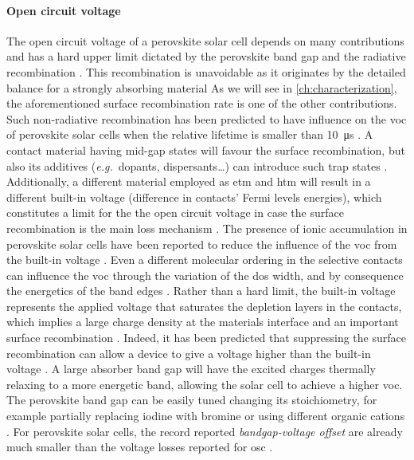 	\paragraph{Open circuit voltage}
	The open circuit voltage of a perovskite solar cell depends on many contributions and has a hard upper limit dictated by the perovskite band gap and the radiative recombination \cite{Tress2017,Tress2015a}.
	This recombination is unavoidable as it originates by the detailed balance for a strongly absorbing material \cite[24]{Nelson2003}
	As we will see in \cref{ch:characterization}, the aforementioned surface recombination rate is one of the other contributions.
	Such non\hyp{}radiative recombination has been predicted to have influence on the \gls{voc} of perovskite solar cells when the relative lifetime is smaller than \SI{10}{\us} \cite{Tress2017,Kirchartz2019}.
	A contact material having mid-gap states will favour the surface recombination, but also its additives (\textsl{e.g.}\ dopants, dispersants\dots) can introduce such trap states \cite{Correa-Baena2017}.
	Additionally, a different material employed as \gls{etm} and \gls{htm} will result in a different built-in voltage (difference in contacts' Fermi levels energies), which constitutes a limit for the the open circuit voltage \cite{Gelmetti2019,Wu2016} in case the surface recombination is the main loss mechanism \cite{Tress2017}.
	The presence of ionic accumulation in perovskite solar cells have been reported to reduce the influence of the \gls{voc} from the built-in voltage \cite{Belisle2016}.
	Even a different molecular ordering in the selective contacts can influence the \gls{voc} through the variation of the \gls{dos} width, and by consequence the energetics of the band edges \cite{Shao2016}.
	Rather than a hard limit, the built-in voltage represents the applied voltage that saturates the depletion layers in the contacts, which implies a large charge density at the materials interface and an important surface recombination \cite{Gelmetti2019,Kirchartz2019}.
	Indeed, it has been predicted that suppressing the surface recombination can allow a device to give a voltage higher than the built-in voltage \cite{Kirchartz2019}.
	A large absorber band gap will have the excited charges thermally relaxing to a more energetic band, allowing the solar cell to achieve a higher \gls{voc}.
	The perovskite band gap can be easily tuned changing its stoichiometry, for example partially replacing iodine with bromine \cite{McMeekin2016,Noh2013a,Wheeler2017} or using different organic cations \cite{Eperon2014}.
	For perovskite solar cells, the record reported \textit{bandgap\hyp{}voltage offset} are already much smaller than the voltage losses reported for \gls{osc} \cite{Tvingstedt2015}.
